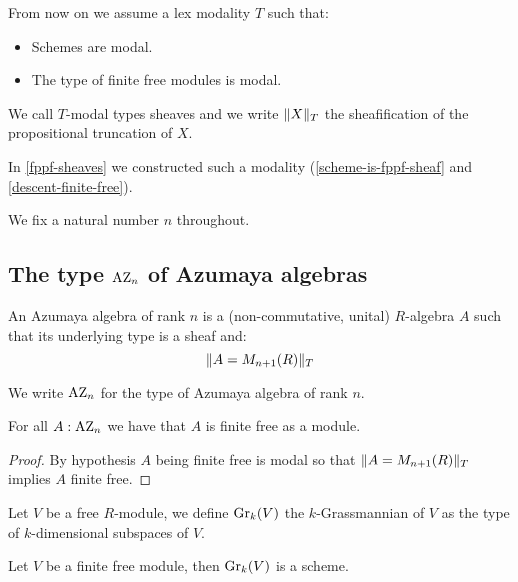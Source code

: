 From now on we assume a lex modality $T$ such that:
\begin{itemize}
\item Schemes are modal.
\item The type of finite free modules is modal.
\end{itemize}
We call $T$-modal types sheaves and we write $\lVert X \rVert_T$ the sheafification of the propositional truncation of $X$.

In \cref{fppf-sheaves} we constructed such a modality (\cref{scheme-is-fppf-sheaf} and \cref{descent-finite-free}).

We fix a natural number $n$ throughout.


\subsection{The type $\mathrm{AZ}_n$ of Azumaya algebras}

\begin{definition}
An Azumaya algebra of rank $n$ is a (non-commutative, unital) $R$-algebra $A$ such that its underlying type is a sheaf and:
\[\lVert A=M_{n+1}(R) \rVert_T\]
\end{definition}

We write $\mathrm{AZ}_n$ for the type of Azumaya algebra of rank $n$.

\begin{lemma}\label{azumayas-are-finite-free}
For all $A:\mathrm{AZ}_n$ we have that $A$ is finite free as a module.
\end{lemma}

\begin{proof}
By hypothesis $A$ being finite free is modal so that $\lVert A=M_{n+1}(R) \rVert_T$ implies $A$ finite free.
\end{proof}

\begin{definition}
Let $V$ be a free $R$-module, we define $\mathrm{Gr}_k(V)$ the $k$-Grassmannian of $V$ as the type of $k$-dimensional subspaces of $V$.
\end{definition}

\begin{lemma}\label{grassmanians-are-schemes}
Let $V$ be a finite free module, then $\mathrm{Gr}_k(V)$ is a scheme.
\end{lemma}

